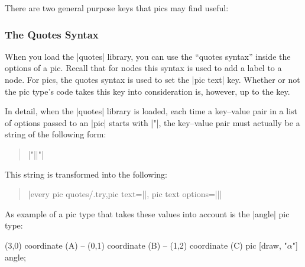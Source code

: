 There are two general purpose keys that pics may find useful:




\subsubsection{The Quotes Syntax}
\label{section-pic-quotes}

When you load the |quotes| library, you can use the ``quotes syntax'' inside
the options of a pic. Recall that for nodes this syntax is used to add a label
to a node. For pics, the quotes syntax is used to set the |pic text| key.
Whether or not the pic type's code takes this key into consideration is,
however, up to the key.

In detail, when the |quotes| library is loaded, each time a key--value pair in
a list of options passed to an |pic| starts with |"|, the key--value pair must
actually be a string of the following form:
%
\begin{quote}
    |"||"|
\end{quote}
%
This string is transformed into the following:
%
\begin{quote}
    |every pic quotes/.try,pic text=||, pic text options={||}|
\end{quote}

As example of a pic type that takes these values into account is the |angle|
pic type:
%
\begin{codeexample}[preamble={\usetikzlibrary{angles,quotes}}]
\tikz \draw (3,0) coordinate (A)
         -- (0,1) coordinate (B)
         -- (1,2) coordinate (C)
            pic [draw, "$\alpha$"] {angle};
\end{codeexample}


